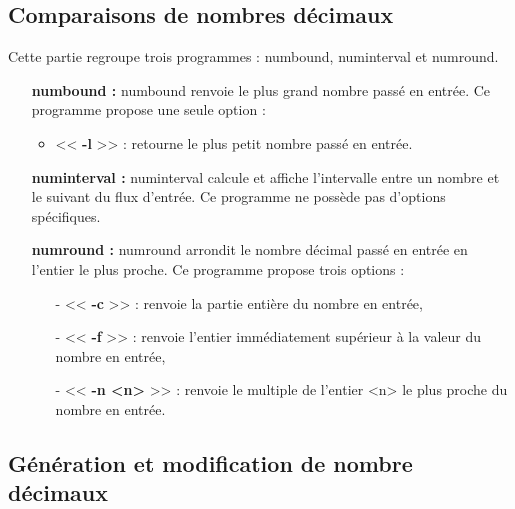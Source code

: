 \subsection{Comparaisons de nombres d\'ecimaux}

Cette partie regroupe trois programmes : numbound, numinterval et numround.
\newline
\begin{itemize}
 \item[\textbullet]  \textbf{numbound :} numbound renvoie le plus grand nombre pass\'e en entr\'ee.
Ce programme propose une seule option :
\begin{itemize}
  \item << \textbf{-l} >> : retourne le plus petit nombre pass\'e en entr\'ee.
\newline
\end{itemize}
 \item[\textbullet] \textbf{numinterval :} numinterval calcule et affiche l'intervalle entre un nombre et le suivant du flux d'entr\'ee.
Ce programme ne poss\`ede pas d'options sp\'ecifiques.
\newline{}
 \item[\textbullet] \textbf{numround :} numround arrondit le nombre d\'ecimal pass\'e en entr\'ee en l'entier le plus proche.
Ce programme propose trois options :
\begin{itemize}
 \item[-] << \textbf{-c} >> : renvoie la partie enti\`ere du nombre en entr\'ee,
 \item[-] << \textbf{-f} >> : renvoie l'entier imm\'ediatement sup\'erieur \`a la valeur du nombre en entr\'ee, 
 \item[-] << \textbf{-n <n>} >> : renvoie le multiple de l'entier <n> le plus proche du nombre en entr\'ee.
\end{itemize}
\end{itemize}

\subsection{G\'en\'eration et modification de nombre d\'ecimaux}


